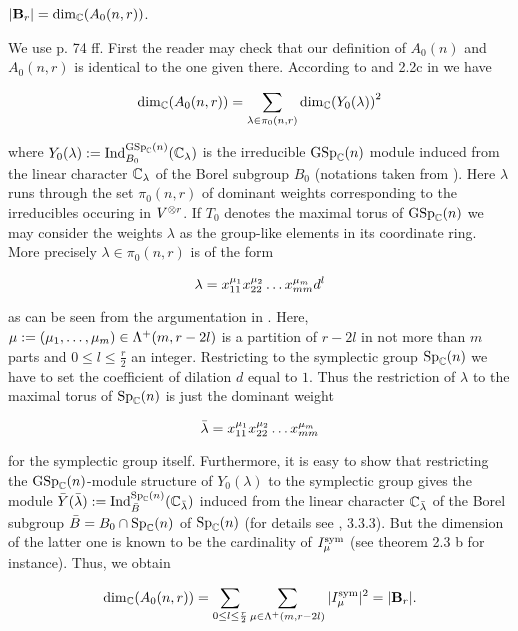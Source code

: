 \documentclass[twoside,12pt]{article}
\begin{document}
\begin{prop} \label{|B_r|}
$|{\bf B}_r|={\rm dim}_{{\mathbb C}}{(A_0(n,r))}$.
\end{prop}


\begin{Pf} We use \cite{donk3} p. 74 ff.
First the reader may check that our definition of $A_0(n)$ and
$A_0(n,r)$ is identical to the one given there.
According to
\cite{donk3} and 2.2c in \cite{donk2} we have

\begin{equation} \label{Dim A_0}
{\rm dim}_{{\mathbb C}}{(A_0(n,r))}=
 \sum_{\lambda\in \pi_0(n,r)} {\rm dim}_{{\mathbb C}}{(Y_0(\lambda))}^2
\end{equation}

where $Y_0(\lambda):={\rm Ind}_{B_0}^{{\rm GSp}_{{\mathbb C}}(n)}({{\mathbb C}}_{\lambda})$ is the
irreducible ${\rm GSp}_{{\mathbb C}}(n)$ module induced from
the linear character ${{\mathbb C}}_{\lambda}$
of the Borel subgroup $B_0$ (notations taken from \cite{donk3}). 
Here $\lambda$ runs through the set $\pi_0(n,r)$ of dominant weights
corresponding to the irreducibles occuring in $V^{\otimes r}$. If $T_0$ denotes
the  maximal torus of ${\rm GSp}_{{\mathbb C}}(n)$ we may consider the
weights $\lambda$ as the group-like elements in its coordinate
ring. More precisely $\lambda\in \pi_0(n,r)$ is of the form

\[ \lambda=x_{1 1}^{\mu_1}x_{2 2}^{\mu_2} \ldots x_{m m}^{\mu_m} d^l
\]

as can be seen from the argumentation in \cite{donk3}. Here,
$\mu:=(\mu_1, \ldots , \mu_m)\in \Lambda^+(m, r-2l)$ is a partition of
$r-2l$ in not more than $m$ parts and $0\leq l\leq \frac r2$ an
integer. Restricting to the symplectic group ${\rm Sp}_{{\mathbb C}}(n)$ we have
to set the coefficient of dilation $d$ equal to $1$. Thus the restriction of
$\lambda$ to the maximal torus of ${\rm Sp}_{{\mathbb C}}(n)$ is just the dominant
weight

\[ \bar{\lambda}=x_{1 1}^{\mu_1}x_{2 2}^{\mu_2} \ldots x_{m m}^{\mu_m} 
\]


for the symplectic group itself. Furthermore, it is easy to show that
restricting the ${\rm GSp}_{{\mathbb C}}(n)$-module structure of $Y_0(\lambda)$ to  
the symplectic group gives
the module $\bar Y(\bar{\lambda}):=
{\rm Ind}_{\bar B}^{{\rm Sp}_{{\mathbb C}}(n)}({{\mathbb C}}_{\bar{\lambda}})$ induced from the linear
character ${{\mathbb C}}_{\bar{\lambda}}$ of the Borel subgroup 
$\bar B=B_0\cap {\rm Sp}_{{\mathbb C}}(n)$ of ${\rm Sp}_{{\mathbb C}}(n)$ (for details see
\cite{doc}, 3.3.3). But the dimension of the latter one is known to
be the cardinality of $I_{\mu}^{\rm sym}$ (see \cite{donk1}
theorem 2.3 b for instance). Thus, we obtain


\[ 
{\rm dim}_{{\mathbb C}}{(A_0(n,r))}=
\sum_{0\leq l\leq \frac r2}\sum_{\mu \in\Lambda^+(m, r-2l)}
|I_{\mu}^{\rm sym} |^2=|{\bf B}_r|.
\]

\end{Pf}
\end{document}
